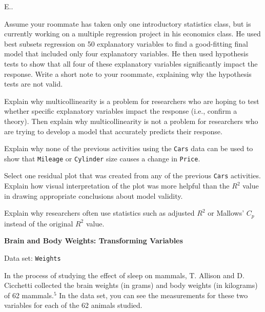 \documentclass[
]{report}
\newcounter{excount}
\begin{document}
\begin{list}{E..}{ \setlength{\itemsep}{1.2em}}
  \item Assume your roommate has taken only one introductory statistics class, but is currently working on a multiple regression project in his economics class. He used best subsets regression on 50 explanatory variables to find a good-fitting final model that included only four explanatory variables. He then used hypothesis tests to show that all four of these explanatory variables significantly impact the response. Write a short note to your roommate, explaining why the hypothesis tests are not valid.

  \item Explain why multicollinearity is a problem for researchers who are hoping to test whether specific explanatory variables impact the response (i.e., confirm a theory). Then explain why multicollinearity is not a problem for researchers who are trying to develop a model that accurately predicts their response.

  \item Explain why none of the previous activities using the \texttt{Cars} data can be used to show that \texttt{Mileage} or \texttt{Cylinder} size causes a change in \texttt{Price}.

  \item Select one residual plot that was created from any of the previous \texttt{Cars} activities. Explain how visual interpretation of the plot was more helpful than the $R^2$ value in drawing appropriate conclusions about model validity.

  \item Explain why researchers often use statistics such as adjusted $R^2$ or Mallows’ $C_p$ instead of the original $R^2$ value.

  \item \textbf{Brain and Body Weights: Transforming Variables}

Data set: \texttt{Weights}

In the process of studying the effect of sleep on mammals, T. Allison and D. Cicchetti collected the brain weights (in grams) and body weights (in kilograms) of 62 mammals.$^5$ In the data set, you can see the measurements for these two variables for each of the 62 animals studied.


\end{list}
\end{document}

